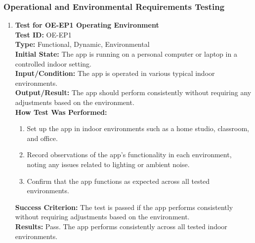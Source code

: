 \documentclass[12pt, titlepage]{article}
\begin{document}
\subsubsection{Operational and Environmental Requirements Testing}
\begin{enumerate}
    \item \textbf{Test for OE-EP1 Operating Environment} \\
      \newline
      \textbf{Test ID:} OE-EP1 \\
      \textbf{Type:} Functional, Dynamic, Environmental \\
      \textbf{Initial State:} The app is running on a personal computer or laptop in a controlled indoor setting. \\
      \textbf{Input/Condition:} The app is operated in various typical indoor environments. \\
      \textbf{Output/Result:} The app should perform consistently without requiring any adjustments based on the environment. \\
      \textbf{How Test Was Performed:}
      \begin{enumerate}
          \item Set up the app in indoor environments such as a home studio, classroom, and office.
          \item Record observations of the app's functionality in each environment, noting any issues related to lighting 
          or ambient noise.
          \item Confirm that the app functions as expected across all tested environments.
      \end{enumerate}
      \textbf{Success Criterion:} The test is passed if the app performs consistently without requiring adjustments based on the environment.\\
      \textbf{Results:} Pass. The app performs consistently across all tested indoor environments.\\


\end{enumerate}
\end{document}
